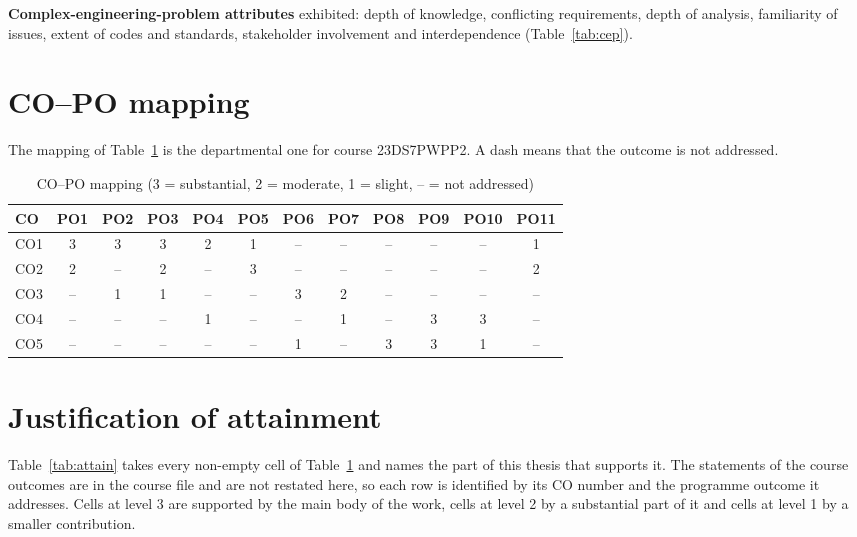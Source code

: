 \noindent\textbf{Complex-engineering-problem attributes} exhibited: depth of knowledge, conflicting requirements, depth of analysis, familiarity of issues, extent of codes and standards, stakeholder involvement and interdependence (Table~\ref{tab:cep}).

\section{CO--PO mapping}

\noindent The mapping of Table~\ref{tab:copo} is the departmental one for course 23DS7PWPP2. A dash means that the outcome is not addressed.

\begin{table}[H]
\centering
\caption{CO--PO mapping (3 = substantial, 2 = moderate, 1 = slight, -- = not addressed)}
\label{tab:copo}
\small
\setlength{\tabcolsep}{6pt}
\begin{tabular}{|l|c|c|c|c|c|c|c|c|c|c|c|}
\hline
\textbf{CO} & \textbf{PO1} & \textbf{PO2} & \textbf{PO3} & \textbf{PO4} & \textbf{PO5} & \textbf{PO6} & \textbf{PO7} & \textbf{PO8} & \textbf{PO9} & \textbf{PO10} & \textbf{PO11} \\ \hline
CO1 & 3 & 3 & 3 & 2 & 1 & -- & -- & -- & -- & -- & 1 \\ \hline
CO2 & 2 & -- & 2 & -- & 3 & -- & -- & -- & -- & -- & 2 \\ \hline
CO3 & -- & 1 & 1 & -- & -- & 3 & 2 & -- & -- & -- & -- \\ \hline
CO4 & -- & -- & -- & 1 & -- & -- & 1 & -- & 3 & 3 & -- \\ \hline
CO5 & -- & -- & -- & -- & -- & 1 & -- & 3 & 3 & 1 & -- \\ \hline
\end{tabular}
\end{table}

\section{Justification of attainment}

\noindent Table~\ref{tab:attain} takes every non-empty cell of Table~\ref{tab:copo} and names the part of this thesis that supports it. The statements of the course outcomes are in the course file and are not restated here, so each row is identified by its CO number and the programme outcome it addresses. Cells at level 3 are supported by the main body of the work, cells at level 2 by a substantial part of it and cells at level 1 by a smaller contribution.

